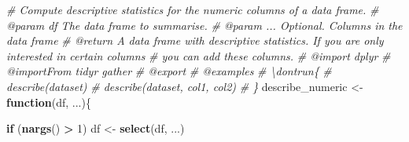 \documentclass[
]{article}
\newenvironment{Shaded}{\begin{snugshade}}{\end{snugshade}}
\newcommand{\CommentTok}[1]{\textcolor[rgb]{0.56,0.35,0.01}{\textit{#1}}}
\newcommand{\ControlFlowTok}[1]{\textcolor[rgb]{0.13,0.29,0.53}{\textbf{#1}}}
\newcommand{\DecValTok}[1]{\textcolor[rgb]{0.00,0.00,0.81}{#1}}
\newcommand{\KeywordTok}[1]{\textcolor[rgb]{0.13,0.29,0.53}{\textbf{#1}}}
\newcommand{\NormalTok}[1]{#1}
\newcommand{\OperatorTok}[1]{\textcolor[rgb]{0.81,0.36,0.00}{\textbf{#1}}}
\newcommand{\StringTok}[1]{\textcolor[rgb]{0.31,0.60,0.02}{#1}}
\begin{document}
\begin{Shaded}
\begin{Highlighting}[]
\CommentTok{\#\textquotesingle{} Compute descriptive statistics for the numeric columns of a data frame.}
\CommentTok{\#\textquotesingle{} @param df The data frame to summarise.}
\CommentTok{\#\textquotesingle{} @param ... Optional. Columns in the data frame}
\CommentTok{\#\textquotesingle{} @return A data frame with descriptive statistics. If you are only interested in certain columns}
\CommentTok{\#\textquotesingle{} you can add these columns.}
\CommentTok{\#\textquotesingle{} @import dplyr}
\CommentTok{\#\textquotesingle{} @importFrom tidyr gather}
\CommentTok{\#\textquotesingle{} @export}
\CommentTok{\#\textquotesingle{} @examples}
\CommentTok{\#\textquotesingle{} \textbackslash{}dontrun\{}
\CommentTok{\#\textquotesingle{} describe(dataset)}
\CommentTok{\#\textquotesingle{} describe(dataset, col1, col2)}
\CommentTok{\#\textquotesingle{} \}}
\NormalTok{describe\_numeric \textless{}{-}}\StringTok{ }\ControlFlowTok{function}\NormalTok{(df, ...)\{}

    \ControlFlowTok{if}\NormalTok{ (}\KeywordTok{nargs}\NormalTok{() }\OperatorTok{\textgreater{}}\StringTok{ }\DecValTok{1}\NormalTok{) df \textless{}{-}}\StringTok{ }\KeywordTok{select}\NormalTok{(df, ...)}


\end{Highlighting}
\end{Shaded}
\end{document}
